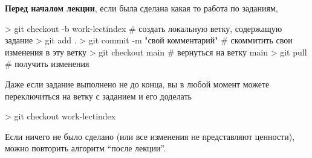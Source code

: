 {\bf Перед началом лекции}, если была сделана какая то работа по заданиям,
\begin{shelloutput}
> git checkout -b work-lect{index}    # создать локальную ветку, содержащую задание
> git add .
> git commit -m "{свой комментарий}"  # скоммитить свои изменения в эту ветку
> git checkout main                   # вернуться на ветку main
> git pull                            # получить изменения
\end{shelloutput}

Даже если задание выполнено не до конца, вы в любой момент можете переключиться на ветку с заданием и его доделать
\begin{shelloutput}
> git checkout work-lect{index}
\end{shelloutput}

Если ничего не было сделано (или все изменения не представляют ценности), можно повторить алгоритм ``после лекции''.

